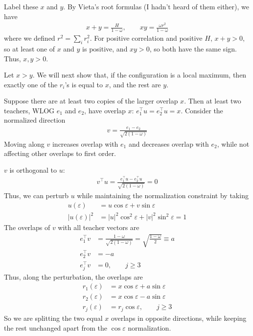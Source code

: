 \documentclass[11pt, reqno]{amsart}
\theoremstyle{notestyle}
\theoremstyle{defstyle}
\begin{document}
Label these $x$ and $y$.
By Vieta's root formulas (I hadn't heard of them either), we have
\begin{align}\label{eq:vieta}
    x + y = \frac{H}{1-\omega},
    \qquad
    xy = \frac{\omega r^2}{1-\omega}
\end{align}
where we defined $r^2 = \sum_i r_i^2$.
For positive correlation and positive $H$, $x+y > 0$, so at least one of $x$ and $y$ is positive, and $xy > 0$, so both have the same sign.
Thus, $x,y > 0$.

Let $x > y$.
We will next show that, if the configuration is a local maximum, then exactly one of the $r_i$'s is equal to $x$, and the rest are $y$.

Suppose there are at least two copies of the larger overlap $x$.
Then at least two teachers, WLOG $e_1$ and $e_2$, have overlap $x$: $e_1^\top u = e_2^\top u = x$.
Consider the normalized direction
\begin{align*}
    v
    = \frac{e_1 - e_2}{\sqrt{2(1-\omega)}}
\end{align*}
Moving along $v$ increases overlap with $e_1$ and decreases overlap with $e_2$, while not affecting other overlaps to first order.

$v$ is orthogonal to $u$:
\begin{align*}
    v^\top u
    = \frac{e_1^\top u - e_2^\top u}{\sqrt{2(1-\omega)}}
    = 0
\end{align*}
Thus, we can perturb $u$ while maintaining the normalization constraint by taking
\begin{align*}
    u(\varepsilon)
    &= u \cos\varepsilon + v \sin\varepsilon \\
    |u(\varepsilon)|^2
    &= |u|^2 \cos^2 \varepsilon
    + |v|^2 \sin^2 \varepsilon
    = 1
\end{align*}
The overlaps of $v$ with all teacher vectors are
\begin{align*}
    e_1^\top v
    &= \frac{1 - \omega}{\sqrt{2(1-\omega)}}
    = \sqrt{\frac{1-\omega}{2}}
    \equiv a \\
    e_2^\top v
    &= -a \\
    e_j^\top v &= 0,
    \qquad j \geq 3
\end{align*}
Thus, along the perturbation, the overlaps are
\begin{align*}
    r_1(\varepsilon)
    &= x \cos\varepsilon + a \sin\varepsilon \\
    r_2(\varepsilon)
    &= x \cos\varepsilon - a \sin\varepsilon \\
    r_j(\varepsilon)
    &= r_j \cos\varepsilon,
    \qquad j \geq 3
\end{align*}
So we are splitting the two equal $x$ overlaps in opposite directions, while keeping the rest unchanged apart from the $\cos\varepsilon$ normalization.
\end{document}
